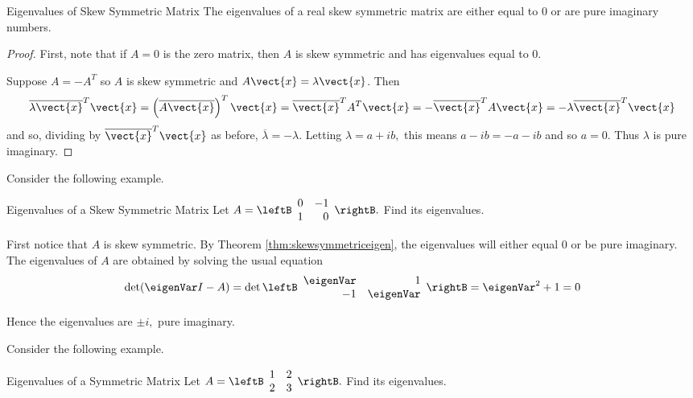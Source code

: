 \begin{theorem}{Eigenvalues of Skew Symmetric Matrix}\label{thm:skewsymmetriceigen}
The eigenvalues of a real skew symmetric matrix are either equal to $0$ or are pure imaginary numbers.
\end{theorem}

\begin{proof}
First, note that if $A=0$ is the zero matrix, then $A$ is skew symmetric and has eigenvalues equal to $0$. 

Suppose $A=-A^{T}$ so $A$ is skew symmetric and $A\vect{x}=\lambda 
\vect{x}$. Then 
\begin{equation*}
\overline{\lambda \vect{x}}^{T}\vect{x}=\left( \overline{A
\vect{x}}\right) ^{T}\vect{x}=\overline{\vect{x}}^{T}A^{T}\vect{x}=-
\overline{\vect{x}}^{T}A\vect{x}=-\lambda \overline{\vect{x}}^{T}
\vect{x}
\end{equation*}
and so, dividing by $\overline{\vect{x}}^{T}\vect{x}$ as before, $
\overline{\lambda }=-\lambda .$ Letting $\lambda =a+ib,$ this means $
a-ib=-a-ib$ and so $a=0.$ Thus $\lambda $ is pure imaginary. 
\end{proof}

Consider the following example. 

\begin{example}{Eigenvalues of a Skew Symmetric Matrix}\label{exa:skewsymmeigenvalues}
Let $A=\leftB
\begin{array}{rr}
0 & -1 \\
1 & 0
\end{array}
\rightB .$  Find its eigenvalues.
\end{example}

\begin{solution}
First notice that $A$ is skew symmetric. By Theorem \ref{thm:skewsymmetriceigen}, the eigenvalues will either equal $0$ or be pure imaginary.  The eigenvalues of $A$ are obtained by solving the usual equation 
\[
\det (\eigenVar I - A ) = 
\det \leftB
\begin{array}{rr}
\eigenVar & 1 \\ 
-1 & \eigenVar
\end{array}
\rightB =\eigenVar ^{2}+1=0
\]

Hence the eigenvalues are $\pm i,$ pure
imaginary.
\end{solution}

Consider the following example.

\begin{example}{Eigenvalues of a Symmetric Matrix}\label{exa:eigenvaluessymmetric}
Let $A=\leftB
\begin{array}{rr}
1 & 2 \\
2 & 3
\end{array}
\rightB .$ Find its eigenvalues.
\end{example}

